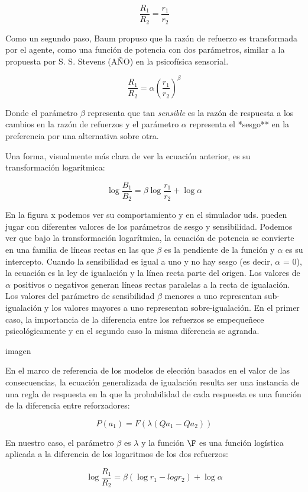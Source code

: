 \documentclass[
  a4paper,
  DIV=11,
  numbers=noendperiod]{scrreprt}
\begin{document}
\[\frac {R_1} {R_2} = \frac {r_1} {r_2}\]

Como un segundo paso, Baum propuso que la razón de refuerzo es
transformada por el agente, como una función de potencia con dos
parámetros, similar a la propuesta por S. S. Stevens (AÑO) en la
psicofísica sensorial.

\[ \frac{R_1}{R_2} = \alpha \left( \frac{r_1}{ r_2} \right)^\beta\]

Donde el parámetro \(\beta\) representa que tan \emph{sensible} es la
razón de respuesta a los cambios en la razón de refuerzos y el parámetro
\(\alpha\) representa el *sesgo** en la preferencia por una alternativa
sobre otra.

Una forma, visualmente más clara de ver la ecuación anterior, es su
transformación logarítmica:

\[\log \frac{B_1}{B_2} = \beta \log\frac{r_1}{r_2} + \log \alpha\]

En la figura x podemos ver su comportamiento y en el simulador uds.
pueden jugar con diferentes valores de los parámetros de sesgo y
sensibilidad. Podemos ver que bajo la transformación logarítmica, la
ecuación de potencia se convierte en una familia de líneas rectas en las
que \(\beta\) es la pendiente de la función y \(\alpha\) es su
intercepto. Cuando la sensibilidad es igual a uno y no hay sesgo (es
decir, \(\alpha\) = 0), la ecuación es la ley de igualación y la línea
recta parte del origen. Los valores de \(\alpha\) positivos o negativos
generan líneas rectas paralelas a la recta de igualación. Los valores
del parámetro de sensibilidad \(\beta\) menores a uno representan
sub-igualación y los valores mayores a uno representan sobre-igualación.
En el primer caso, la importancia de la diferencia entre los refuerzos
se empequeñece psicológicamente y en el segundo caso la misma diferencia
se agranda.

imagen

En el marco de referencia de los modelos de elección basados en el valor
de las consecuencias, la ecuación generalizada de igualación resulta ser
una instancia de una regla de respuesta en la que la probabilidad de
cada respuesta es una función de la diferencia entre reforzadores:

\[P(a_1)= F(\lambda(Qa_1 -Qa_2))\]

En nuestro caso, el parámetro \(\beta\) es \(\lambda\) y la función
\(\F\) es una función logística aplicada a la diferencia de los
logaritmos de los dos refuerzos:

\[\log \frac{R_1}{R_2} = \beta (\log{r_1} - log{r_2}) + \log \alpha\]
\end{document}
